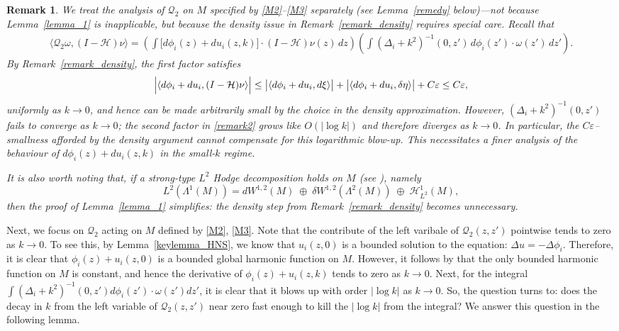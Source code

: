 \documentclass[12pt]{amsart}
\newtheorem{remark}[theorem]{Remark}
\begin{document}
\begin{remark}
We treat the analysis of $\mathcal{Q}_2$ on $M$ specified by \eqref{M2}–\eqref{M3} separately (see Lemma~\ref{remedy} below)—not because Lemma~\ref{lemma_1} is inapplicable, but because the density issue in Remark~\ref{remark_density} requires special care. Recall that
\begin{align}\label{remark2}
\langle \mathcal{Q}_2 \omega, (I-\mathcal{H})\nu \rangle
= \left(\int \bigl[d\phi_i(z)+du_i(z,k)\bigr]\cdot (I-\mathcal{H})\nu(z)\,dz\right)
  \left(\int (\Delta_i+k^2)^{-1}(0,z')\, d\phi_i(z')\cdot \omega(z')\,dz' \right).
\end{align}
By Remark~\ref{remark_density}, the first factor satisfies
\[
\Bigl|\langle d\phi_i+du_i, (I-\mathcal{H})\nu \rangle\Bigr|
\le \bigl|\langle d\phi_i+du_i, d\xi \rangle\bigr|
       + \bigl|\langle d\phi_i+du_i, \delta\eta \rangle\bigr| + C\varepsilon
\le C\varepsilon,
\]
uniformly as $k\to 0$, and hence can be made arbitrarily small by the choice in the density approximation. However, $(\Delta_i+k^2)^{-1}(0,z')$ fails to converge as $k\to 0$; the second factor in \eqref{remark2} grows like $O(|\log k|)$ and therefore diverges as $k\to 0$. In particular, the $C\varepsilon$–smallness afforded by the density argument cannot compensate for this logarithmic blow-up. This necessitates a finer analysis of the behaviour of $d\phi_i(z)+du_i(z,k)$ in the small-$k$ regime.

It is also worth noting that, if a strong-type $L^2$ Hodge decomposition holds on $M$ (see \cite{Gromov}), namely
\[
L^2(\Lambda^1(M))
= d W^{1,2}(M)\;\oplus\; \delta W^{1,2}(\Lambda^2(M))\;\oplus\; \mathcal{H}_{L^2}^1(M),
\]
then the proof of Lemma~\ref{lemma_1} simplifies: the density step from Remark~\ref{remark_density} becomes unnecessary.
\end{remark}



Next, we focus on $\mathcal{Q}_2$ acting on $M$ defined by \eqref{M2}, \eqref{M3}. Note that the contribute of the left varibale of $\mathcal{Q}_2(z,z')$ pointwise tends to zero as $k\to 0$. To see this, by Lemma~\ref{keylemma_HNS}, we know that $u_i(z,0)$ is a bounded solution to the equation: $\Delta u = - \Delta\phi_i$. Therefore, it is clear that $\phi_i(z) + u_i(z,0)$ is a bounded global harmonic function on $M$. However, it follows by \cite[Lemma~2.8, 2.10]{HNS} that the only bounded harmonic function on $M$ is constant, and hence the derivative of $\phi_i(z) + u_i(z,k)$ tends to zero as $k\to 0$. Next, for the integral $\int (\Delta_i + k^2)^{-1}(0,z') d\phi_i(z')\cdot \omega(z') dz'$, it is clear that it blows up with order $|\log{k}|$ as $k\to 0$. So, the question turns to: does the decay in $k$ from the left variable of $\mathcal{Q}_2(z,z')$ near zero fast enough to kill the $|\log{k}|$ from the integral? We answer this question in the following lemma. 
\end{document}
